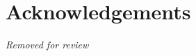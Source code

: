 \documentclass[11pt]{article}
\begin{document}
\section*{Acknowledgements}

\emph{Removed for review}

%

\small{

}
\end{document}
